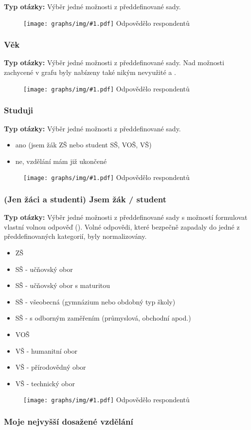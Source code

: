 \documentclass[12pt, a4paper, twoside]{article}
\newcommand{\answercount}[1]{Odpovědělo  respondentů}
\newcommand{\includegraph}[2]{
  \begin{figure}[H]
    \centering
    \textbf{#2}
    \texttt{[image: graphs/img/\#1.pdf]}
    \answercount{#1}
  \end{figure}
}
\newcommand{\qtype}{\textbf{Typ otázky:}
}
\newcommand{\pickOne}{Výběr jedné možnosti z předdefinované sady\xspace}
\newcommand{\withOther}{s možností formulovat vlastní volnou odpověď (\uv{Jiné})\xspace}
\begin{document}
\qtype \pickOne.

\includegraph{jsem}{}

\subsubsection{Věk}

\qtype \pickOne.
Nad možnosti zachycené v grafu byly nabízeny také nikým nevyužité
 a .

\includegraph{vek}{}

\subsubsection{Studuji}

\qtype \pickOne.

\begin{itemize}
\item ano (jsem žák ZŠ nebo student SŠ, VOŠ, VŠ)
\item ne, vzdělání mám již ukončené
\end{itemize}

\includegraph{studuji}{}

\subsubsection{(Jen žáci a studenti) Jsem žák / student}

\qtype \pickOne \withOther.
Volné odpovědi, které bezpečně zapadaly do jedné z předdefinovaných
kategorií, byly normalizovány.

\begin{itemize}
\item ZŠ
\item SŠ - učňovský obor
\item SŠ - učňovský obor s maturitou
\item SŠ - všeobecná (gymnázium nebo obdobný typ školy)
\item SŠ - s odborným zaměřením (průmyslová, obchodní apod.)
\item VOŠ
\item VŠ - humanitní obor
\item VŠ - přírodovědný obor
\item VŠ - technický obor
\end{itemize}

\includegraph{studuji_co}{}

\subsubsection{Moje nejvyšší dosažené vzdělání}
\end{document}
